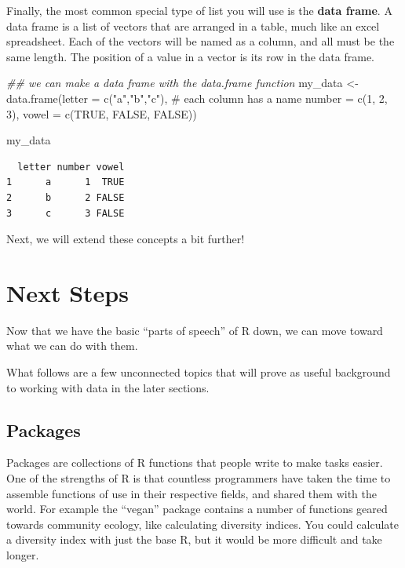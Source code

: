 \documentclass[
  letterpaper,
  DIV=11,
  numbers=noendperiod]{scrreprt}
\newenvironment{Shaded}{\begin{snugshade}}{\end{snugshade}}
\newcommand{\AttributeTok}[1]{\textcolor[rgb]{0.40,0.45,0.13}{#1}}
\newcommand{\CommentTok}[1]{\textcolor[rgb]{0.37,0.37,0.37}{#1}}
\newcommand{\ConstantTok}[1]{\textcolor[rgb]{0.56,0.35,0.01}{#1}}
\newcommand{\DecValTok}[1]{\textcolor[rgb]{0.68,0.00,0.00}{#1}}
\newcommand{\DocumentationTok}[1]{\textcolor[rgb]{0.37,0.37,0.37}{\textit{#1}}}
\newcommand{\FunctionTok}[1]{\textcolor[rgb]{0.28,0.35,0.67}{#1}}
\newcommand{\NormalTok}[1]{\textcolor[rgb]{0.00,0.23,0.31}{#1}}
\newcommand{\OtherTok}[1]{\textcolor[rgb]{0.00,0.23,0.31}{#1}}
\newcommand{\StringTok}[1]{\textcolor[rgb]{0.13,0.47,0.30}{#1}}
\begin{document}
Finally, the most common special type of list you will use is the
\textbf{data frame}. A data frame is a list of vectors that are arranged
in a table, much like an excel spreadsheet. Each of the vectors will be
named as a column, and all must be the same length. The position of a
value in a vector is its row in the data frame.

\begin{Shaded}
\begin{Highlighting}[]
\DocumentationTok{\#\# we can make a data frame with the data.frame function}
\NormalTok{my\_data }\OtherTok{\textless{}{-}} \FunctionTok{data.frame}\NormalTok{(}\AttributeTok{letter =} \FunctionTok{c}\NormalTok{(}\StringTok{"a"}\NormalTok{,}\StringTok{"b"}\NormalTok{,}\StringTok{"c"}\NormalTok{), }\CommentTok{\# each column has a name}
                      \AttributeTok{number =} \FunctionTok{c}\NormalTok{(}\DecValTok{1}\NormalTok{, }\DecValTok{2}\NormalTok{, }\DecValTok{3}\NormalTok{),}
                      \AttributeTok{vowel =} \FunctionTok{c}\NormalTok{(}\ConstantTok{TRUE}\NormalTok{, }\ConstantTok{FALSE}\NormalTok{, }\ConstantTok{FALSE}\NormalTok{))}

\NormalTok{my\_data}
\end{Highlighting}
\end{Shaded}

\begin{verbatim}
  letter number vowel
1      a      1  TRUE
2      b      2 FALSE
3      c      3 FALSE
\end{verbatim}

Next, we will extend these concepts a bit further!

\chapter{Next Steps}\label{next-steps}

Now that we have the basic ``parts of speech'' of R down, we can move
toward what we can do with them.

What follows are a few unconnected topics that will prove as useful
background to working with data in the later sections.

\section{Packages}\label{packages}

Packages are collections of R functions that people write to make tasks
easier. One of the strengths of R is that countless programmers have
taken the time to assemble functions of use in their respective fields,
and shared them with the world. For example the ``vegan'' package
contains a number of functions geared towards community ecology, like
calculating diversity indices. You could calculate a diversity index
with just the base R, but it would be more difficult and take longer.
\end{document}
